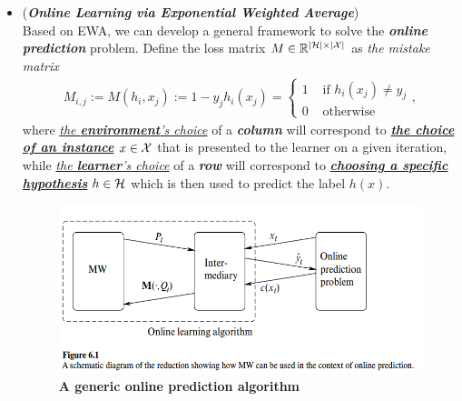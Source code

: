 \documentclass[11pt]{article}
\begin{document}
\begin{itemize}
\item \begin{remark}[Algorithm](\textbf{\emph{Online Learning via Exponential Weighted Average}}) \citep{cesa2006prediction, schapire2012boosting, mohri2018foundations} \\
Based on EWA, we can develop a general framework to solve the \emph{\textbf{online prediction}} problem. Define the loss matrix $M \in {\mathbb R}^{\left\lvert {\mathcal H} \right\rvert \times \left\lvert {\mathcal X} \right\rvert}$ as \emph{the mistake matrix}
\begin{align*}
M_{i,j} := M(h_i, x_j) :=  1 - y_j h_i(x_j) = \left\{ \begin{array}{cc}
1 &\text{ if }h_i(x_j) \neq y_j \\
0 &\text{ otherwise}
\end{array}
\right. ,
\end{align*} where \underline{\emph{the \textbf{environment}'s choice}} of a \emph{\textbf{column}} will correspond to \underline{\emph{\textbf{the choice of an instance}}} $x \in {\mathcal X}$ that is presented to the learner on a given iteration, while \underline{\emph{the \textbf{learner}'s choice}} of a \emph{\textbf{row}} will correspond to \underline{\emph{\textbf{choosing a specific hypothesis}}} $h \in {\mathcal H}$ which is then used to predict the label $h(x)$. 

\begin{figure}
\begin{minipage}[h!]{1\linewidth}
  \centering
  \centerline{\includegraphics[scale = 0.5]{online_learning_boost.png}}
\end{minipage}
\caption{\footnotesize{\textbf{A generic online prediction algorithm \citep{schapire2012boosting}}}}
\label{fig: online_learning_boost}
\end{figure}


\end{remark}
\end{itemize}
\end{document}
